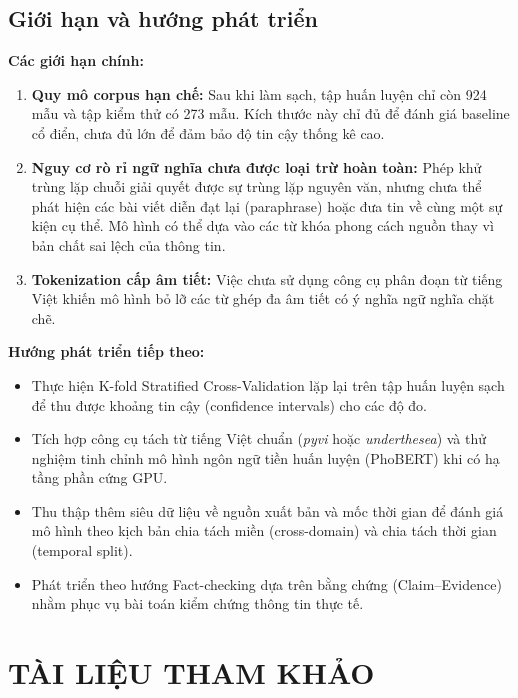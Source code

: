\documentclass[12pt,a4paper]{report}
\begin{document}
\section{Giới hạn và hướng phát triển}
\textbf{Các giới hạn chính:}
\begin{enumerate}[leftmargin=24pt]
  \item \textbf{Quy mô corpus hạn chế:} Sau khi làm sạch, tập huấn luyện chỉ còn 924 mẫu và tập kiểm thử có 273 mẫu. Kích thước này chỉ đủ để đánh giá baseline cổ điển, chưa đủ lớn để đảm bảo độ tin cậy thống kê cao.
  \item \textbf{Nguy cơ rò rỉ ngữ nghĩa chưa được loại trừ hoàn toàn:} Phép khử trùng lặp chuỗi giải quyết được sự trùng lặp nguyên văn, nhưng chưa thể phát hiện các bài viết diễn đạt lại (paraphrase) hoặc đưa tin về cùng một sự kiện cụ thể. Mô hình có thể dựa vào các từ khóa phong cách nguồn thay vì bản chất sai lệch của thông tin.
  \item \textbf{Tokenization cấp âm tiết:} Việc chưa sử dụng công cụ phân đoạn từ tiếng Việt khiến mô hình bỏ lỡ các từ ghép đa âm tiết có ý nghĩa ngữ nghĩa chặt chẽ.
\end{enumerate}

\textbf{Hướng phát triển tiếp theo:}
\begin{itemize}[leftmargin=24pt]
  \item Thực hiện K-fold Stratified Cross-Validation lặp lại trên tập huấn luyện sạch để thu được khoảng tin cậy (confidence intervals) cho các độ đo.
  \item Tích hợp công cụ tách từ tiếng Việt chuẩn (\textit{pyvi} hoặc \textit{underthesea}) và thử nghiệm tinh chỉnh mô hình ngôn ngữ tiền huấn luyện (PhoBERT) khi có hạ tầng phần cứng GPU.
  \item Thu thập thêm siêu dữ liệu về nguồn xuất bản và mốc thời gian để đánh giá mô hình theo kịch bản chia tách miền (cross-domain) và chia tách thời gian (temporal split).
  \item Phát triển theo hướng Fact-checking dựa trên bằng chứng (Claim--Evidence) nhằm phục vụ bài toán kiểm chứng thông tin thực tế.
\end{itemize}

\clearpage
\chapter*{TÀI LIỆU THAM KHẢO}
\end{document}
